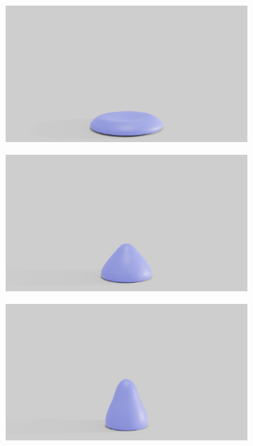 \begin{figure}
\begin{subfigure}{.16\linewidth}
		\label{sfig:ball-vc-3}
	\end{subfigure}%
	\begin{subfigure}{.16\linewidth}
		\centering
		{\includegraphics[width=2.0\textwidth]{images/soft_ball/vp/0350.jpg}}
		\label{sfig:ball-vc-4}
	\end{subfigure}%
	\begin{subfigure}{.16\linewidth}
		\centering
		{\includegraphics[width=2.0\textwidth]{images/soft_ball/vp/0400.jpg}}
		\label{sfig:ball-vc-5}
	\end{subfigure}%
	\begin{subfigure}{.16\linewidth}
		\centering
		{\includegraphics[width=2.0\textwidth]{images/soft_ball/vp/0450.jpg}}

\end{subfigure}
\end{figure}
